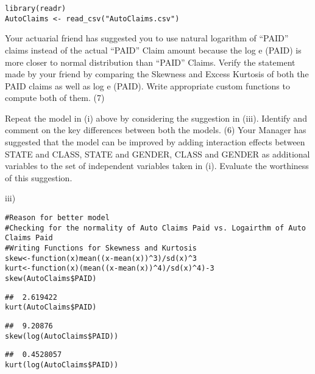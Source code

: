 \documentclass[a4paper,12pt]{article}
\begin{document}
\large



\begin{framed}\begin{verbatim}
library(readr)
AutoClaims <- read_csv("AutoClaims.csv")
\end{verbatim} \end{framed}

Your actuarial friend has suggested you to use natural logarithm of “PAID” claims instead of the actual “PAID” Claim amount because the log e (PAID) is more closer to
normal distribution than “PAID” Claims. Verify the statement made by your friend by comparing the Skewness and Excess Kurtosis of both the PAID claims as well as
log e (PAID). Write appropriate custom functions to compute both of them. (7)

Repeat the model in (i) above by considering the suggestion in (iii). Identify and comment on the key differences between both the models. (6)
Your Manager has suggested that the model can be improved by adding interaction effects between STATE and CLASS, STATE and GENDER, CLASS and GENDER
as additional variables to the set of independent variables taken in (i). Evaluate the worthiness of this suggestion.

iii)



\begin{framed}\begin{verbatim}
#Reason for better model
#Checking for the normality of Auto Claims Paid vs. Logairthm of Auto Claims Paid
#Writing Functions for Skewness and Kurtosis
skew<-function(x)mean((x-mean(x))^3)/sd(x)^3
kurt<-function(x)(mean((x-mean(x))^4)/sd(x)^4)-3
skew(AutoClaims$PAID)
\end{verbatim} 
\end{framed}

\begin{framed}
\begin{verbatim}
##  2.619422
kurt(AutoClaims$PAID)
\end{verbatim} 
\end{framed}

\begin{framed}\begin{verbatim}
##  9.20876
skew(log(AutoClaims$PAID))
\end{verbatim} \end{framed}

\begin{framed}\begin{verbatim}
##  0.4528057
kurt(log(AutoClaims$PAID))
\end{verbatim} \end{framed}
\end{document}
